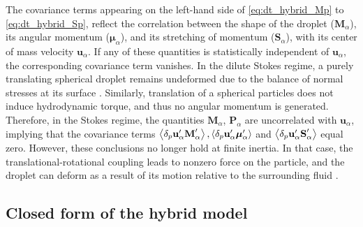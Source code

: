 The covariance terms appearing on the left-hand side of  \ref{eq:dt_hybrid_Mp} to \ref{eq:dt_hybrid_Sp}, reflect the correlation between the shape of the droplet ($\textbf{M}_\alpha$), its angular momentum ($\bm\mu_\alpha$), and its stretching of momentum ($\textbf{S}_\alpha$), with its center of mass velocity $\textbf{u}_\alpha$. 
If any of these quantities is statistically independent of $\textbf{u}_\alpha$, the corresponding covariance term vanishes. 
In the dilute Stokes regime, a purely translating spherical droplet remains undeformed due to the balance of normal stresses at its surface \citep{leal2007advanced}. 
Similarly, translation of a spherical particles does not induce hydrodynamic torque, and thus no angular momentum is generated. 
Therefore, in the Stokes regime, the quantities  $\textbf{M}_\alpha$, $\textbf{P}_\alpha$ are uncorrelated with $\textbf{u}_\alpha$,  implying that the covariance terms $\left<\delta_{p} \textbf{u}_\alpha' \textbf{M}_\alpha'\right>,\left<\delta_{p} \textbf{u}_\alpha' \bm\mu_\alpha'\right>$ and $\left<\delta_{p} \textbf{u}_\alpha' \textbf{S}_\alpha'\right>$ equal zero. 
However, these conclusions no longer hold at finite inertia. 
In that case, the translational-rotational coupling \citep{rubinow1961transverse} leads to nonzero force on the particle, and the droplet can deform as a result of its motion relative to the surrounding fluid \citep{taylor1964deformation}. 





\subsection{Closed form of the hybrid model}

